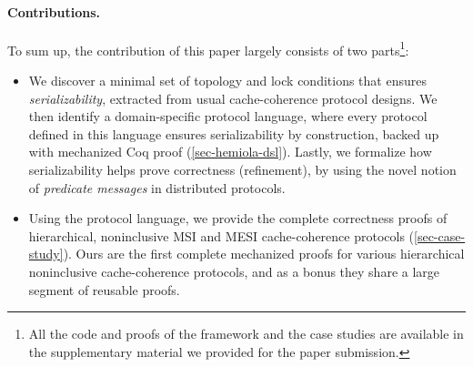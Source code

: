 \documentclass[sigplan,10pt,review,anonymous,screen]{acmart}\settopmatter{printfolios=true,printccs=false,printacmref=false}
\begin{document}
\paragraph{Contributions.}
To sum up, the contribution of this paper largely consists of two parts\footnote{All the code and proofs of the framework and the case studies are available in the supplementary material we provided for the paper submission.}:
\begin{itemize}
\item We discover a minimal set of topology and lock conditions that ensures \emph{serializability}, extracted from usual cache-coherence protocol designs. We then identify a domain-specific protocol language, where every protocol defined in this language ensures serializability by construction, backed up with mechanized Coq proof (\autoref{sec-hemiola-dsl}). Lastly, we formalize how serializability helps prove correctness (refinement), by using the novel notion of \emph{predicate messages} in distributed protocols.
\item Using the protocol language, we provide the complete correctness proofs of hierarchical, noninclusive MSI and MESI cache-coherence protocols (\autoref{sec-case-study}). Ours are the first complete mechanized proofs for various hierarchical noninclusive cache-coherence protocols, and as a bonus they share a large segment of reusable proofs.
\end{itemize}

\end{document}
